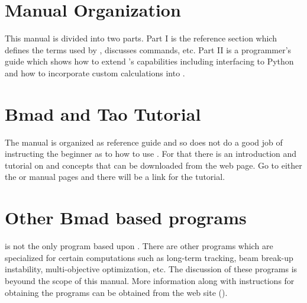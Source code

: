 \section{Manual Organization}

This manual is divided into two parts. Part I is the reference section which defines the terms used
by \tao, discusses \tao commands, etc. Part II is a programmer's guide which shows how to extend
\tao's capabilities including interfacing to Python and how to incorporate custom calculations into
\tao.

\section{Bmad and Tao Tutorial}

\vspace{0.1in}
The \tao manual is organized as reference guide and so does not do a good job of instructing the
beginner as to how to use \tao. For that there is an introduction and tutorial on \bmad and \tao
concepts that can be downloaded from the \bmad web page. Go to either the \bmad or \tao manual pages
and there will be a link for the tutorial.

\section{Other Bmad based programs}
\label{s:other}

\tao is not the only program based upon \bmad. There are other programs which are specialized for
certain computations such as long-term tracking, beam break-up instability, multi-objective
optimization, etc. The discussion of these programs is beyound the scope of this manual. More
information along with instructions for obtaining the programs can be obtained from the \bmad web site ().

